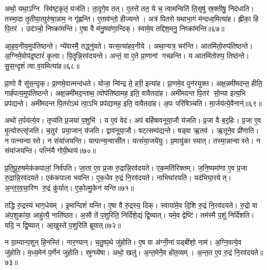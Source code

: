अथो॒ यथा॒ऽग्नि स्वि॑ष्ट॒कृतं॒ यज॑ति।
ता॒दृगे॒व तत्।
ए॒तत्ते॑ तत॒ ये च॒ त्वामन्विति॑ ति॒सृषु॑ स्र॒क्तीषु॒ निद॑धाति।
तस्मा॒दा तृ॒तीया॒त्पुरु॑षा॒न्नाम॒ न गृ॑ह्णन्ति।
ए॒ताव॑न्तो॒ हीज्यन्ते।
अत्र॑ पितरो यथाभा॒गं म॑न्दध्व॒मित्या॑ह।
ह्लीका॒ हि पि॒तर॑।
उद॑ञ्चो॒ निष्क्रा॑मन्ति।
ए॒षा वै म॑नु॒ष्या॑णा॒न्दिक्।
स्वामे॒व तद्दिश॒मनु॒ निष्क्रा॑मन्ति॥६७॥

आ॒ह॒व॒नीय॒मुप॑तिष्ठन्ते।
न्ये॑वास्मै॒ तद्ध्नु॑वते।
यत्स॒त्या॑हव॒नीये।
अथा॒न्यत्र॒ चर॑न्ति।
आतमि॑तो॒रुप॑तिष्ठन्ते।
अ॒ग्निमे॒वोप॑द्र॒ष्टारं॑ कृ॒त्वा।
पि॒तॄन्नि॒रव॑दयन्ते।
अन्तं॒ वा ए॒ते प्रा॒णानां गच्छन्ति।
य आतमि॑तोरुप॒ तिष्ठ॑न्ते।
सु॒स॒न्दृशं॑ त्वा व॒यमित्या॑ह॥६८॥

प्रा॒णो वै सु॑स॒न्दृक्।
प्रा॒णमे॒वात्मन्द॑धते।
योजा॒ न्वि॑न्द्र ते॒ हरी॒ इत्या॑ह।
प्रा॒णमे॒व पुन॑रयुक्त।
अक्ष॒न्नमी॑मदन्त॒ हीति॒ गार्\mbox{}ह॑पत्य॒मुप॑तिष्ठन्ते।
अक्ष॒न्नमी॑मद॒न्ताथ॒ त्वोप॑तिष्ठामह॒ इति॒ वावैतदा॑ह।
अमी॑मदन्त पि॒तर॑ सो॒म्या इत्य॒भि प्रप॑द्यन्ते।
अमी॑मदन्त पि॒तरोऽथ॑ त्वा॒ऽभि प्रप॑द्यामह॒ इति॒ वावैतदा॑ह।
अ॒पः परि॑षिञ्चति।
मा॒र्जय॑त्ये॒वैनान्॑॥६९॥

अथो॑ त॒र्पय॑त्ये॒व।
तृप्य॑ति प्र॒जया॑ प॒शुभि॑।
य ए॒वं वेद॑।
अप॑ बर्\mbox{}हिषावनूया॒जौ य॑जति।
प्र॒जा वै ब॒र्॒हिः।
प्र॒जा ए॒व मृ॒त्योरुत्सृ॑जति।
च॒तुर॑ प्रया॒जान् य॑जति।
द्वाव॑नूया॒जौ।
षट्त्सम्प॑द्यन्ते।
षड्वा ऋ॒तव॑।
ऋ॒तूने॒व प्री॑णाति।
न पत्न्यन्वास्ते।
न संया॑जयन्ति।
यत्पत्न्य॒न्वासी॑त।
यत्सं॑या॒जये॑युः।
प्र॒मायु॑का स्यात्।
तस्मा॒न्नान्वास्ते।
न संया॑जयन्ति।
पत्नि॑यै गोपी॒थाय॑॥७०॥

प्र॒ति॒पू॒रु॒षमेक॑कपालां॒ निर्व॑पति।
जा॒ता ए॒व प्र॒जा रु॒द्रान्नि॒रव॑दयते।
एक॒मति॑रिक्तम्।
ज॒नि॒ष्यमा॑णा ए॒व प्र॒जा रु॒द्रान्नि॒रव॑दयते।
एक॑कपाला भवन्ति।
ए॒क॒धैव रु॒द्रं नि॒रव॑दयते।
नाभिघा॑रयति।
यद॑भिघा॒रयेत्।
अ॒न्त॒र॒व॒चा॒रिण रु॒द्रं कु॑र्यात्।
ए॒को॒ल्मु॒केन॑ यन्ति॥७१॥

तद्धि रु॒द्रस्य॑ भाग॒धेयम्।
इ॒मान्दिशं॑ यन्ति।
ए॒षा वै रु॒द्रस्य॒ दिक्।
स्वाया॑मे॒व दि॒शि रु॒द्रं नि॒रव॑दयते।
रु॒द्रो वा अ॑प॒शुका॑या॒ आहु॑त्यै॒ नाति॑ष्ठत।
अ॒सौ ते॑ प॒शुरिति॒ निर्दि॑शे॒द्यं द्वि॒ष्यात्।
यमे॒व द्वेष्टि॑।
तम॑स्मै प॒शुं निर्दि॑शति।
यदि॒ न द्वि॒ष्यात्।
आ॒खुस्ते॑ प॒शुरिति॑ ब्रूयात्॥७२॥

न ग्रा॒म्यान्प॒शून् हि॒नस्ति॑।
नार॒ण्यान्।
च॒तु॒ष्प॒थे जु॑होति।
ए॒ष वा अ॑ग्नी॒नां पड्बी॑शो॒ नाम॑।
अ॒ग्नि॒वत्ये॒व जु॑होति।
म॒ध्य॒मेन॑ प॒र्णेन॑ जुहोति।
स्रुग्घ्ये॑षा।
अथो॒ खलु॑।
अ॒न्त॒मेनै॒व हो॑त॒व्यम्।
अ॒न्त॒त ए॒व रु॒द्रं नि॒रव॑दयते॥७३॥

